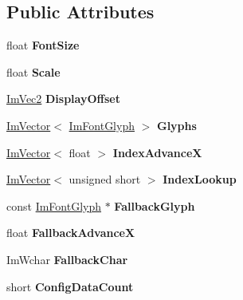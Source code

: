 \subsection*{Public Attributes}
\begin{DoxyCompactItemize}
\item 
\mbox{\label{struct_im_font_a423e36d1594281f1a5a537e5b0d0a3d4}} 
float {\bfseries Font\+Size}
\item 
\mbox{\label{struct_im_font_ae98fb07fd8862a7243d77b11f38bba19}} 
float {\bfseries Scale}
\item 
\mbox{\label{struct_im_font_af9b95f3df0b6d45f45903d82301d7f84}} 
\hyperlink{struct_im_vec2}{Im\+Vec2} {\bfseries Display\+Offset}
\item 
\mbox{\label{struct_im_font_a1a0901fc1a8cbd41d582d6cef4946bc9}} 
\hyperlink{class_im_vector}{Im\+Vector}$<$ \hyperlink{struct_im_font_glyph}{Im\+Font\+Glyph} $>$ {\bfseries Glyphs}
\item 
\mbox{\label{struct_im_font_af906476eda06d8a842d0a843a247f530}} 
\hyperlink{class_im_vector}{Im\+Vector}$<$ float $>$ {\bfseries Index\+AdvanceX}
\item 
\mbox{\label{struct_im_font_aaab48cbf05ca962d71ab3e7b597b992f}} 
\hyperlink{class_im_vector}{Im\+Vector}$<$ unsigned short $>$ {\bfseries Index\+Lookup}
\item 
\mbox{\label{struct_im_font_a0e666b0c49646bd294103f4d288df4b8}} 
const \hyperlink{struct_im_font_glyph}{Im\+Font\+Glyph} $\ast$ {\bfseries Fallback\+Glyph}
\item 
\mbox{\label{struct_im_font_ad58a5ee4492a3a9fa56f73e5a40d728d}} 
float {\bfseries Fallback\+AdvanceX}
\item 
\mbox{\label{struct_im_font_ae54c2c4184bfcbc7b8f6da9cbc4f93c0}} 
Im\+Wchar {\bfseries Fallback\+Char}
\item 
\mbox{\label{struct_im_font_a4a30fc7711d628ad582ccb3188a51ddd}} 
short {\bfseries Config\+Data\+Count}

\end{DoxyCompactItemize}
